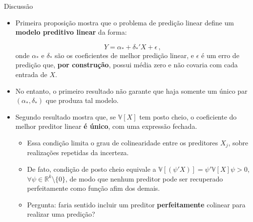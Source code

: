 \documentclass[11pt]{beamer}
\begin{document}
\begin{frame}{Discussão}
	\begin{itemize}
		\item Primeira proposição mostra que o problema de predição linear define um \textbf{modelo preditivo linear} da forma:
		
		$$Y = \alpha_* + \delta_*'X + \epsilon \, ,$$
		onde $\alpha_*$ e $\delta_*$ são os coeficientes de melhor predição linear, e $\epsilon$ é um erro de predição que, \textbf{por construção}, possui média zero e não covaria com cada entrada de $X$.
		\item No entanto, o primeiro resultado não garante que haja somente um único par $(\alpha_*,\delta_*)$ que produza tal modelo. 
		\item Segundo resultado mostra que, se $\mathbb{V}[X]$ tem posto cheio, o coeficiente do melhor preditor linear \textbf{é único}, com uma expressão fechada.
		\begin{itemize}
		\item Essa condição limita o grau de colinearidade entre os preditores $X_j$, sobre realizações repetidas da incerteza.
		\item De fato, condição de posto cheio equivale a $\mathbb{V}[(\psi'X)]=\psi'\mathbb{V}[X]\psi > 0$, $\forall \psi \in \mathbb{R}^k\setminus\{0\}$, de modo que nenhum preditor pode ser recuperado perfeitamente como função afim dos demais.
		\item Pergunta: faria sentido incluir um preditor \textbf{perfeitamente} colinear para realizar uma predição?
		\end{itemize}
		\end{itemize}
	\end{frame}
	
\end{document}
